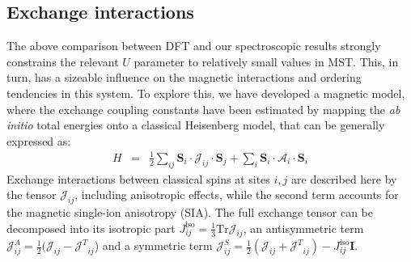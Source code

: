 \documentclass[preprint,amsmath,amssymb,aps,nofootinbib,superscriptaddress]{revtex4-2}
\begin{document}
\subsection{Exchange interactions}
The above comparison between DFT and our spectroscopic results strongly constrains the relevant $U$ parameter to relatively small values in MST. This, in turn, has a sizeable influence on the magnetic interactions and ordering tendencies in this system. To explore this, we have developed a magnetic model, where the exchange coupling constants have been estimated by mapping the {\it ab initio} total energies onto a classical Heisenberg model, that can be generally expressed as:
\begin{eqnarray}\label{eq:model}
H &=& \frac{1}{2}\sum_{ij} \bm S_i \cdot \mathcal{J}_{ij}\cdot \bm S_j +\sum_i\bm S_i \cdot \mathcal{A}_{i}\cdot \bm S_i
\end{eqnarray}
Exchange interactions between classical spins at sites $i,j$ are described here by the tensor $\mathcal{J}_{ij}$, including anisotropic effects, while the second term accounts for the magnetic single-ion anisotropy (SIA). The full exchange tensor can be decomposed into its isotropic part $J^{\mathrm{iso}}_{ij}=\frac{1}{3}\mathrm{Tr}{\mathcal J}_{ij}$, an antisymmetric term ${\mathcal J}^A_{ij}=\frac{1}{2}({\mathcal J}_{ij}-{\mathcal J^T}_{ij}$) and a symmetric term ${\mathcal J}^S_{ij}=\frac12({\mathcal J}_{ij}+{\mathcal J^T}_{ij})-J^{\mathrm{iso}}_{ij}\bm I$.
\end{document}
